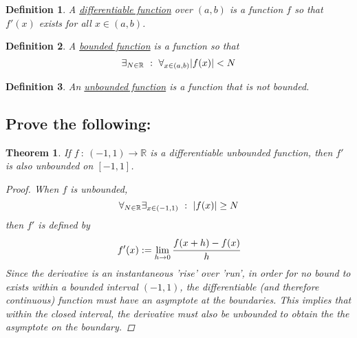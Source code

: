 \documentclass[]{article}
\newcommand{\R}{\mathbb{R}}
\newcommand{\st}{\ : \ }
\newtheorem{definition}{Definition}
\newtheorem{theorem}{Theorem}
\begin{document}
\newpage
\section{}

\begin{definition}
    A \emph{\underline{differentiable function}} over $(a,b)$ is a function $f$ so that $f'(x)$ exists for all $x \in (a,b)$.
\end{definition}

\begin{definition}
    A \emph{\underline{bounded function}} is a function so that 
    \[
        \exists_{N \in \R} \st \forall_{x \in (a,b)} \abs{f(x)} < N
    \]
\end{definition}

\begin{definition}
    An \emph{\underline{unbounded function}} is a function that is not bounded.
\end{definition}

\subsection{Prove the following:}
\begin{theorem}
    If $f \st (-1,1) \to \R$ is a differentiable unbounded function, then $f'$ is also unbounded on $[-1,1]$.
    \begin{proof}
        When $f$ is unbounded,
        \[
            \forall_{N \in \R} \exists_{x \in (-1,1)} \st \abs{f(x)} \geq N
        \]
        then $f'$ is defined by
        \[
            f'(x) := \lim_{h \to 0} \cfrac{f(x + h) - f(x)}{h}
        \]
        Since the derivative is an instantaneous 'rise' over 'run', in order for no bound to exists within a bounded interval $(-1,1)$, the differentiable (and therefore continuous) function must have an asymptote at the boundaries. This implies that within the closed interval, the derivative must also be unbounded to obtain the the asymptote on the boundary.
    \end{proof}
\end{theorem}

\end{document}

